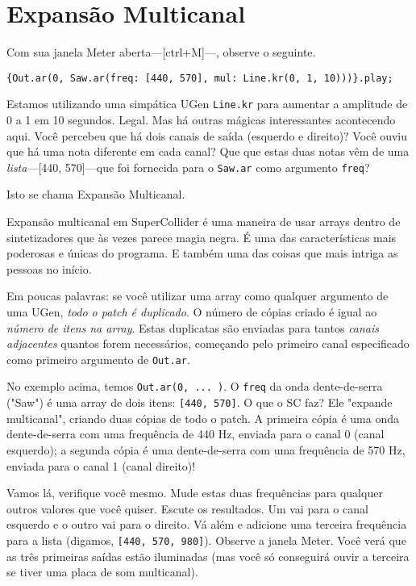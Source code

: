 \section{Expansão Multicanal}

Com sua janela Meter aberta---[ctrl+M]---, observe o seguinte.

\begin{lstlisting}[style=SuperCollider-IDE, basicstyle=\scttfamily\footnotesize]
{Out.ar(0, Saw.ar(freq: [440, 570], mul: Line.kr(0, 1, 10)))}.play;
\end{lstlisting}

Estamos utilizando uma simpática UGen \texttt{Line.kr} para aumentar a amplitude de 0 a 1 em 10 segundos. Legal. Mas há outras mágicas interessantes acontecendo aqui. Você percebeu que há dois canais de saída (esquerdo e direito)? Você ouviu que há uma nota diferente em cada canal? Que que estas duas notas vêm de uma \emph{lista}---[440, 570]---que foi fornecida para o \texttt{Saw.ar} como argumento \texttt{freq}?

Isto se chama Expansão Multicanal.

Expansão multicanal em SuperCollider é uma maneira de usar arrays dentro de sintetizadores que às vezes parece magia negra. É uma das características mais poderosas e únicas do programa. E também uma das coisas que mais intriga as pessoas no início.

Em poucas palavras: se você utilizar uma array como qualquer argumento de uma UGen, \emph{todo o patch é duplicado}. O número de cópias criado é igual ao \textit{número de itens na array}. Estas duplicatas são enviadas para tantos \textit{canais adjacentes} quantos forem necessários, começando pelo primeiro canal especificado como primeiro argumento de \texttt{Out.ar}.

No exemplo acima, temos \texttt{Out.ar(0, ... )}. O \texttt{freq} da onda dente-de-serra ("Saw") é uma array de dois itens: \texttt{[440, 570]}. O que o SC faz? Ele "expande multicanal", criando duas cópias de todo o patch. A primeira cópia é uma onda dente-de-serra com uma frequência de 440 Hz, enviada para o canal 0 (canal esquerdo); a segunda cópia é uma dente-de-serra com uma frequência de 570 Hz, enviada para o canal 1 (canal direito)!

Vamos lá, verifique você mesmo. Mude estas duas frequências para qualquer outros valores que você quiser. Escute os resultados. Um vai para o canal esquerdo e o outro vai para o direito. Vá além e adicione uma terceira frequência para a lista (digamos, \texttt{[440, 570, 980]}). Observe a janela Meter. Você verá que as três primeiras saídas estão iluminadas (mas você só conseguirá ouvir a terceira se tiver uma placa de som multicanal).

